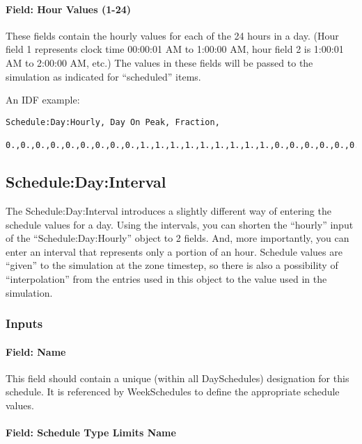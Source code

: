 \paragraph{Field: Hour Values (1-24)}\label{field-hour-values-1-24}

These fields contain the hourly values for each of the 24 hours in a day. (Hour field 1 represents clock time 00:00:01 AM to 1:00:00 AM, hour field 2 is 1:00:01 AM to 2:00:00 AM, etc.) The values in these fields will be passed to the simulation as indicated for ``scheduled'' items.

An IDF example:

\begin{lstlisting}
Schedule:Day:Hourly, Day On Peak, Fraction,
  0.,0.,0.,0.,0.,0.,0.,0.,0.,1.,1.,1.,1.,1.,1.,1.,1.,1.,0.,0.,0.,0.,0.,0.;
\end{lstlisting}

\subsection{Schedule:Day:Interval}\label{scheduledayinterval}

The Schedule:Day:Interval introduces a slightly different way of entering the schedule values for a day. Using the intervals, you can shorten the ``hourly'' input of the ``Schedule:Day:Hourly'' object to 2 fields. And, more importantly, you can enter an interval that represents only a portion of an hour. Schedule values are ``given'' to the simulation at the zone timestep, so there is also a possibility of ``interpolation'' from the entries used in this object to the value used in the simulation.

\subsubsection{Inputs}\label{inputs-2-036}

\paragraph{Field: Name}\label{field-name-2-034}

This field should contain a unique (within all DaySchedules) designation for this schedule. It is referenced by WeekSchedules to define the appropriate schedule values.

\paragraph{Field: Schedule Type Limits Name}\label{field-schedule-type-limits-name-1-000}

